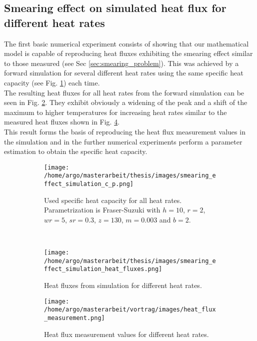 \documentclass{scrartcl}[12pt, halfparskip]
\numberwithin{equation}{section}
\numberwithin{figure}{section}
\numberwithin{table}{section}
\begin{document}
\subsection{Smearing effect on simulated heat flux for different heat rates}
The first basic numerical experiment consists of showing that our mathematical model is capable of reproducing heat fluxes exhibiting the smearing effect similar to those measured (see Sec \ref{sec:smearing_problem}). This was achieved by a forward simulation for several different heat rates using  the same specific heat capacity (see Fig. \ref{fig:smearing_effect_c_p}) each time. \\
The resulting heat fluxes for all heat rates from the forward simulation can be seen in Fig. \ref{fig:smearing_effect_simulation_heat_flux}. They exhibit obviously a widening of the peak and a shift of the maximum to higher temperatures for increasing heat rates similar to the measured heat fluxes shown in Fig. \ref{fig:smearing_effect_measurement_heat_flux}. \\
This result forms the basis of reproducing the heat flux measurement values in the simulation and in the further numerical experiments perform a parameter estimation to obtain the specific heat capacity. 



\begin{figure}[H]
	\centering
	\begin{subfigure}{0.9\textwidth}
		\centering
		\texttt{[image: /home/argo/masterarbeit/thesis/images/smearing\_effect\_simulation\_c\_p.png]}
		\caption{Used specific heat capacity for all heat rates. Parametrization is Fraser-Suzuki with $h=10$, $r=2$, $wr=5$, $sr=0.3$, $z=130$, $m=0.003$ and $b=2$.}
		\label{fig:smearing_effect_c_p}
	\end{subfigure} \\
	\begin{subfigure}{0.49\textwidth}
		\texttt{[image: /home/argo/masterarbeit/thesis/images/smearing\_effect\_simulation\_heat\_fluxes.png]}
		\caption{Heat fluxes from simulation for different heat rates.}
		\label{fig:smearing_effect_simulation_heat_flux}
	\end{subfigure}
	\begin{subfigure}{0.49\textwidth}
		\texttt{[image: /home/argo/masterarbeit/vortrag/images/heat\_flux\_measurement.png]}
		\caption{Heat flux measurement values for different heat rates.}
		\label{fig:smearing_effect_measurement_heat_flux}
	\end{subfigure}
	\caption{}
\end{figure}
\end{document}
